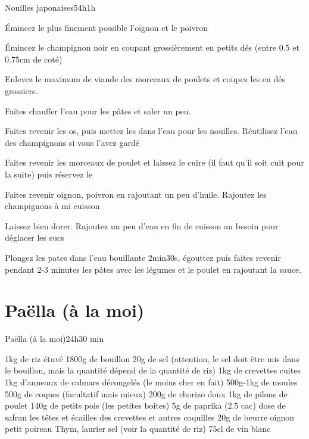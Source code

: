{\begin{recette}{Nouilles japonaises}{5}{4h}{1h}
\begin{preparation}
\item Émincez le plus finement possible l'oignon et le poivron
\item Émincez le champignon noir en coupant grossièrement en petits dés (entre 0.5 et 0.75cm de coté)
\item Enlevez le maximum de viande des morceaux de poulets et coupez les en dés grossiers. 
\item Faites chauffer l'eau pour les pâtes et saler un peu.
\item Faites revenir les os, puis mettez les dans l'eau pour les nouilles. Réutilisez l'eau des champignons si vous l'avez gardé
\item Faites revenir les morceaux de poulet et laissez le cuire (il faut 
qu'il soit cuit pour la suite) puis réservez le
\item Faites revenir oignon, poivron en rajoutant un peu d'huile. Rajoutez les champignons à mi cuisson
\item Laissez bien dorer. Rajoutez un peu d'eau en fin de cuisson au besoin pour déglacer les sucs
\item Plongez les pates dans l'eau bouillante 2min30s, égouttez puis faites revenir pendant 2-3 minutes les pâtes avec les 
légumes et le poulet en rajoutant la sauce.
\end{preparation}
\end{recette}

\section{Paëlla (à la moi)}
\begin{recette}{Paëlla (à la moi)}{2}{4h}{30 min}
\begin{ingredients}
\ingredient[Paella]
\ingredient 1kg de riz étuvé
\ingredient 1800g de bouillon
\ingredient 20g de sel (attention, le sel doit être mis dans le bouillon, mais la quantité dépend de la quantité de riz)
\ingredient 1kg de crevettes cuites
\ingredient 1kg d'anneaux de calmars décongelés (le moins cher en fait)
\ingredient 500g-1kg de moules
\ingredient 500g de coques (facultatif mais mieux)
\ingredient 200g de chorizo doux
\ingredient 1kg de pilons de poulet
\ingredient 140g de petits pois (les petites boites)
\ingredient 5g de paprika (2.5 cac)
 dose de safran
\ingredient les têtes et écailles des crevettes et autres coquilles
\ingredient 20g de beurre
 oignon
 petit poireau
\ingredient Thym, laurier
\ingredient sel (voir la quantité de riz)
\ingredient 75cl de vin blanc
\end{ingredients}


\end{recette}}
